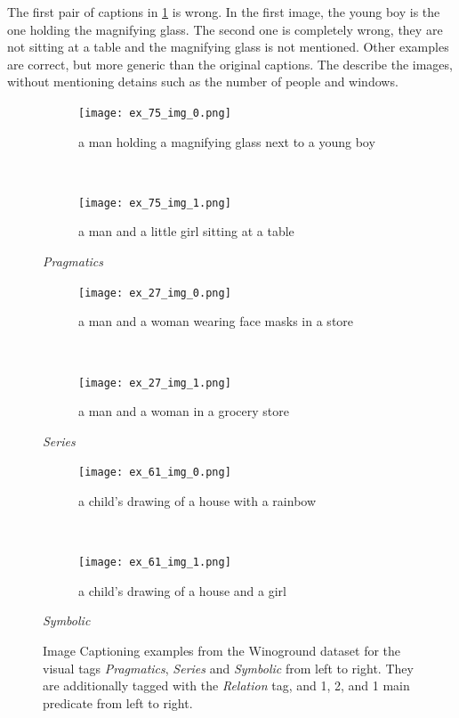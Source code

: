 The first pair of captions in \cref{fig:captioning-examples-visual} is wrong. In the first image, the young boy is the one holding the magnifying glass. The second one is completely wrong, they are not sitting at a table and the magnifying glass is not mentioned. Other examples are correct, but more generic than the original captions. The describe the images, without mentioning detains such as the number of people and windows.

\begin{figure}[ht]
\centering
    \begin{minipage}{.30\textwidth}
        \begin{subfigure}{\textwidth}
        \centering
        \texttt{[image: ex\_75\_img\_0.png]}
        \caption{a man holding a magnifying glass next to a young boy}
        \end{subfigure}\\
        \begin{subfigure}{\textwidth}
        \centering
        \texttt{[image: ex\_75\_img\_1.png]}
        \caption{a man and a little girl sitting at a table}
        \end{subfigure}%
        \caption*{\textit{Pragmatics}}
    \end{minipage}
    \hfill
    \begin{minipage}{.30\textwidth}
        \begin{subfigure}{\textwidth}
        \centering
        \texttt{[image: ex\_27\_img\_0.png]}
        \caption{a man and a woman wearing face masks in a store}
        \end{subfigure}\\
        \begin{subfigure}{\textwidth}
        \centering
        \texttt{[image: ex\_27\_img\_1.png]}
        \caption{a man and a woman in a grocery store}
        \end{subfigure}%
        \caption*{\textit{Series}}
    \end{minipage}
    \hfill
    \begin{minipage}{.30\textwidth}
        \begin{subfigure}{\textwidth}
        \centering
        \texttt{[image: ex\_61\_img\_0.png]}
        \caption{a child's drawing of a house with a rainbow}
        \end{subfigure}\\
        \begin{subfigure}{\textwidth}
        \centering
        \texttt{[image: ex\_61\_img\_1.png]}
        \caption{a child's drawing of a house and a girl}
        \end{subfigure}%
        \caption*{\textit{Symbolic}}
    \end{minipage}
    \caption{Image Captioning examples from the Winoground dataset for the visual tags \textit{Pragmatics}, \textit{Series} and \textit{Symbolic} from left to right. They are additionally tagged with the \textit{Relation} tag, and 1, 2, and 1 main predicate from left to right.}
    \label{fig:captioning-examples-visual}
\end{figure}

